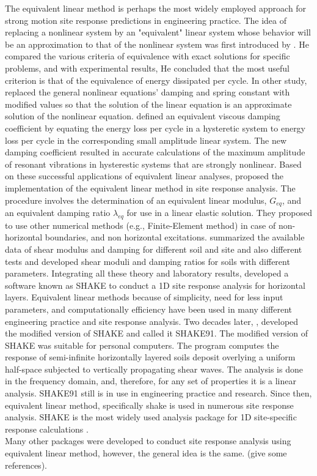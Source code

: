 The equivalent linear method is perhaps the most widely employed approach for strong motion site response predictions in engineering practice\citep{Assimaki2008quantifying}. The idea of replacing a nonlinear system by an "equivalent" linear system whose behavior will be an approximation to that of the nonlinear system was first introduced by \citet{jacobsen1930steady}. He compared the various criteria of equivalence with exact solutions for specific problems,  and with experimental results, He concluded that the most useful criterion is that of the equivalence of energy dissipated per cycle. In other study, \citet{Kryloff1943} replaced the general nonlinear equations' damping and spring constant with modified values so that the solution of the linear equation is an approximate solution of the nonlinear equation. \citet{Hudson1965}  defined an equivalent viscous damping coefficient by equating the energy loss per cycle in a hysteretic system to energy loss per cycle in the corresponding small amplitude linear system. The new damping coefficient resulted in accurate calculations of the maximum amplitude of resonant vibrations in hysterestic systems that are strongly nonlinear.  Based on these successful applications of equivalent linear analyses, \citet{Idriss1968} proposed the implementation of the equivalent linear method in site response analysis. The procedure involves the determination of an equivalent linear modulus, $G_{eq}$, and an equivalent damping ratio $\lambda_{eq}$ for use in a linear elastic solution. They proposed to use other numerical methods (e.g., Finite-Element method) in case of  non-horizontal boundaries, and non horizontal excitations. \citet{Idriss1970} summarized the available data of shear modulus and damping for different soil and site and also different tests  and  developed  shear moduli and damping ratios for soils with different parameters. Integrating all these theory and laboratory results,  \citet{Schnabel1972a} developed a software known as SHAKE to conduct a 1D site response analysis for horizontal layers. Equivalent linear methods because of simplicity, need for less input parameters, and computationally efficiency have been used in many different engineering practice and site response analysis. Two decades later, \citet{Idriss1992}, developed the modified version of SHAKE and called it SHAKE91. The modified version of SHAKE was suitable for personal computers. The program computes the response of  semi-infinite horizontally layered soils deposit overlying a uniform half-space subjected to vertically propagating shear waves. The analysis is done in the frequency domain, and, therefore, for any set of properties it is a linear analysis. SHAKE91 still is in use in engineering practice and research. Since then, equivalent linear method, specifically shake is used in numerous site response analysis. SHAKE is the most widely used analysis package for 1D site-specific response calculations \citet{Assimaki2008quantifying}. \\
Many other packages were developed to conduct site response analysis using equivalent linear method, however, the general idea is the same. (give some references).


